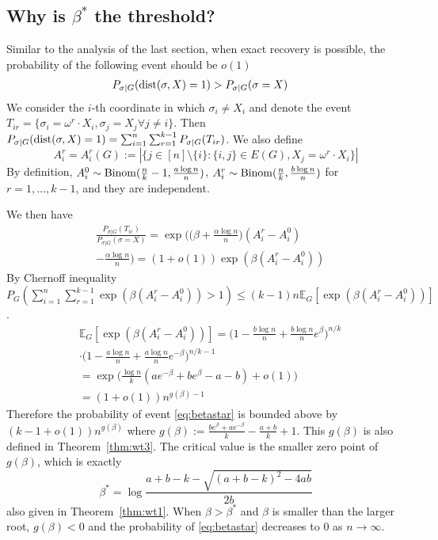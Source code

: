 \documentclass{article}
\begin{document}
\subsection{Why is $\beta^\ast$ the threshold?} \label{sect:why}
	Similar to the analysis of the last section, when exact recovery is possible, the probability of the following event should be $o(1)$
\begin{align}
P_{\sigma | G}(\operatorname{dist}(\sigma, X) = 1) & > P_{\sigma | G}(\sigma = X)\label{eq:betastar}
\end{align}
We consider the $i$-th coordinate in which $\sigma_i \neq X_i$ and denote the event $T_{ir}=\{\sigma_i = \omega^r \cdot X_i, \sigma_j = X_j \forall j \neq i\}$.
Then $P_{\sigma | G}(\operatorname{dist}(\sigma, X) = 1) = \sum_{i=1}^n\sum_{r=1}^{k-1} P_{\sigma | G}(T_{ir})$.
We also define
\begin{equation}\label{eq:Ari}
A^r_i=A^r_i(G):=|\{j\in[n]\setminus\{i\}:\{i,j\}\in E(G), X_j=\omega^r \cdot X_i\} |
\end{equation}
By definition,
$A^0_i\sim \operatorname{Binom}(\frac{n}{k}-1,\frac{a\log n}{n})$, $A^r_i\sim \operatorname{Binom}(\frac{n}{k}, \frac{b\log n}{n})$ for $r=1,\dots, k-1$, and they are independent.

We then have
\begin{align}
&\frac{P_{\sigma|G}(T_{ir})}
{P_{\sigma|G}(\sigma=X)}
= \exp\Big(\big(\beta+\frac{\alpha\log n}{n} \big) (A^r_i-A^0_i) \nonumber\\
&-\frac{\alpha\log n}{n} \Big) 
= (1+o(1)) \exp ( \beta(A^r_i-A^0_i)) \label{eq:diffAr0}
\end{align}
By Chernoff inequality $ P_G(\sum_{i=1}^n\sum_{r=1}^{k-1}\exp ( \beta(A^r_i-A^0_i)) > 1) \leq (k-1)n\mathbb{E}_G[\exp (\beta (A^r_i-A^0_i))] $.
\begin{align}
&\mathbb{E}_G[\exp (\beta (A^r_i-A^0_i))]
=\Big(1-\frac{b\log n}{n}+\frac{b\log n}{n} e^{\beta} \Big)^{n/k} \nonumber \\
&\cdot \Big(1-\frac{a\log n}{n}+\frac{a\log n}{n} e^{-\beta} \Big)^{n/k-1}\nonumber\\
& = 
\exp\Big(\frac{\log n}{k} ( a e^{-\beta}+b e^{\beta} -a-b )
+o(1) \Big)\nonumber \\
& = (1+o(1)) n^{g(\beta)-1} \label{eq:gbetaminus1}
\end{align}
Therefore the probability of event \eqref{eq:betastar} is bounded above by $ (k-1 + o(1)) n^{g(\beta)}$
where $g(\beta)  := \frac{b e^{\beta}+a e^{-\beta}}{k}-\frac{a+b}{k}+1$. This $g(\beta)$ is also defined in Theorem~\ref{thm:wt3}.
The critical value is the smaller zero point of $g(\beta)$, which is exactly
\begin{equation}\label{eq:beta_star}
\beta^* = \log\frac{a+b-k-\sqrt{(a+b-k)^2-4ab}}{2 b}
\end{equation}
also given in Theorem~\ref{thm:wt1}.
When $\beta > \beta^*$ and $\beta$ is smaller than the larger root, $g(\beta) < 0$ and the probability of \eqref{eq:betastar} decreases to
$0$ as $n\to \infty$.
\end{document}
